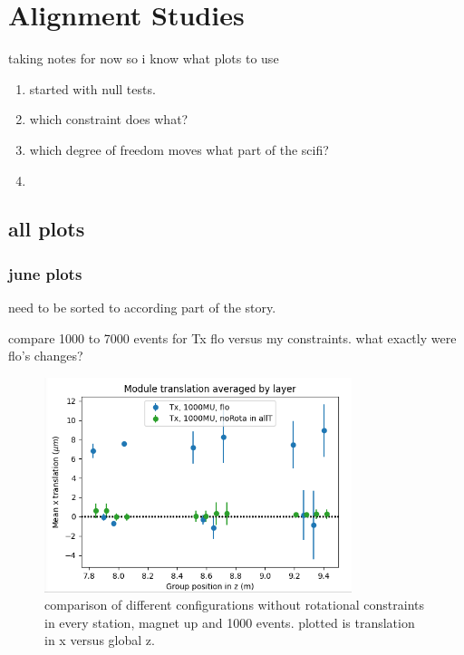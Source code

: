 \chapter{Alignment Studies}
\label{sec:story}
taking notes for now so i know what plots to use
\begin{enumerate}
  \item started with null tests.
  \item which constraint does what?
  \item which degree of freedom moves what part of the scifi?
  \item
\end{enumerate}

\section{all plots}
\subsection{june plots}

need to be sorted to according part of the story.

compare 1000 to 7000 events for Tx flo versus my constraints.
what exactly were flo's changes?
\begin{figure}
  \centering
  \includegraphics[width=0.8\textwidth]{plots/june_21/Tx_noRota_allT_1000MU.png}
  \caption{comparison of different configurations without rotational constraints in every station, magnet up and 1000 events. plotted is translation in x versus global z.}
  \label{fig:june_2}
\end{figure}

